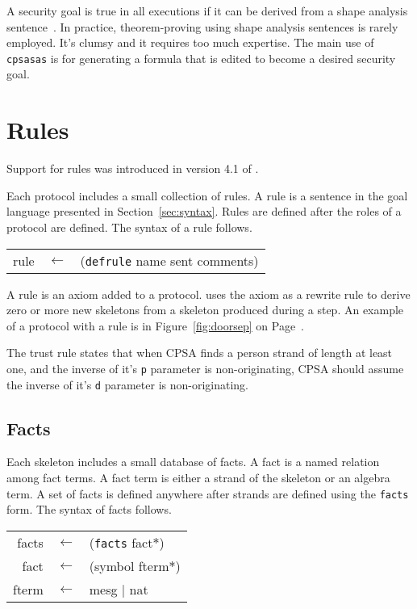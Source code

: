 \documentclass[12pt]{article}
\newcommand{\sym}[1]{\textup{\texttt{#1}}}
\begin{document}
A security goal is true in all executions if it can be derived from a
shape analysis sentence~\cite{Ramsdell12}.  In practice,
theorem-proving using shape analysis sentences is rarely employed.
It's clumsy and it requires too much expertise.  The main use of
\texttt{cpsasas} is for generating a formula that is edited to become
a desired security goal.

\section{Rules}\label{sec: rules}

Support for rules was introduced in version 4.1 of {\cpsa}.

Each protocol includes a small collection of rules.  A rule is a
sentence in the goal language presented in Section~\ref{sec:syntax}.
Rules are defined after the roles of a protocol are defined.  The
syntax of a rule follows.

\begin{center}\scshape
  \begin{tabular}{rcl}
    rule&$\leftarrow$&(\sym{defrule} name sent comments)
  \end{tabular}
\end{center}

A rule is an axiom added to a protocol.  {\cpsa} uses the axiom as a
rewrite rule to derive zero or more new skeletons from a skeleton
produced during a step.  An example of a protocol with a rule is in
Figure~\ref{fig:doorsep} on Page~\pageref{fig:doorsep}.

The trust rule states that when CPSA finds a person strand of length
at least one, and the inverse of it's \texttt{p} parameter is
non-originating, CPSA should assume the inverse of it's \texttt{d}
parameter is non-originating.

\subsection{Facts}\label{sec:facts}
Each skeleton includes a small database of facts.  A fact is a named
relation among fact terms.  A fact term is either a
strand of the skeleton or an algebra term.  A set of facts is
defined anywhere after strands are defined using the \sym{facts} form.
The syntax of facts follows.

\begin{center}\scshape
  \begin{tabular}{rcl}
    facts&$\leftarrow$&(\sym{facts} fact$\ast$) \\
    fact&$\leftarrow$&(symbol fterm$\ast$) \\
    fterm&$\leftarrow$&mesg $\mid$ nat
  \end{tabular}
\end{center}
\end{document}
